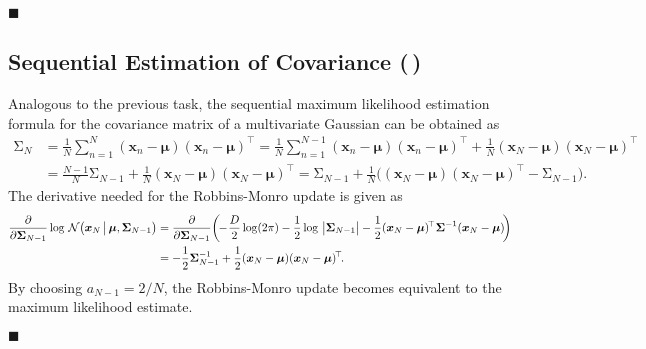 \documentclass[11pt, a4paper]{scrartcl}
\newcommand{\transposed}{{\!\top\!}}
\renewcommand{\vec}[1]{\bm{#1}}
\newcommand{\mat}[1]{\bm{\mathrm{#1}}}
\newcommand{\biggiven}{\,\big\vert\,}
\newcommand{\eot}{\hfill\(\blacksquare\)}
\newcommand{\diffstar}{\texorpdfstring{\raisebox{-1pt}{\resizebox{!}{8pt}{\(\star\)}}}{*}}
\newcommand{\twostar}  {(\diffstar\,\diffstar)}
\begin{document}
			\eot

		\subsection{Sequential Estimation of Covariance  \twostar}
			Analogous to the previous task, the sequential maximum likelihood estimation formula for the covariance matrix of a multivariate Gaussian can be obtained as
			\begin{align}
				\mat{\Sigma}_N
					&= \frac{1}{N} \sum_{n = 1}^{N} (\vec{x}_n - \vec{\mu}) (\vec{x}_n - \vec{\mu})^\transposed
					 = \frac{1}{N} \sum_{n = 1}^{N - 1} (\vec{x}_n - \vec{\mu}) (\vec{x}_n - \vec{\mu})^\transposed + \frac{1}{N} (\vec{x}_N - \vec{\mu}) (\vec{x}_N - \vec{\mu})^\transposed \\
					&= \frac{N - 1}{N} \mat{\Sigma}_{N - 1} + \frac{1}{N} (\vec{x}_N - \vec{\mu}) (\vec{x}_N - \vec{\mu})^\transposed
					 = \mat{\Sigma}_{N - 1} + \frac{1}{N} \big( (\vec{x}_N - \vec{\mu}) (\vec{x}_N - \vec{\mu})^\transposed - \mat{\Sigma}_{N - 1} \big).
			\end{align}
			The derivative needed for the Robbins-Monro update is given as
			\begin{align}
				\pdv{\mat{\Sigma}_{N - 1}} \log \, \mathcal{N}\big( \vec{x}_N \biggiven \vec{\mu}, \mat{\Sigma}_{N - 1} \big)
					&= \pdv{\mat{\Sigma}_{N - 1}} \bigg(\!\! -\!\frac{D}{2} \log(2\pi) - \frac{1}{2} \log \, \big\lvert \mat{\Sigma}_{N - 1} \big\rvert - \frac{1}{2} (\vec{x}_N - \vec{\mu})^\transposed\, \mat{\Sigma}^{-1} (\vec{x}_N - \vec{\mu}) \!\bigg) \\
					&= -\frac{1}{2} \mat{\Sigma}_{N - 1}^{-1} + \frac{1}{2} (\vec{x}_N - \vec{\mu}) (\vec{x}_N - \vec{\mu})^\transposed.
			\end{align}
			By choosing \( a_{N - 1} = 2/N \), the Robbins-Monro update becomes equivalent to the maximum likelihood estimate.

			\eot
\end{document}
